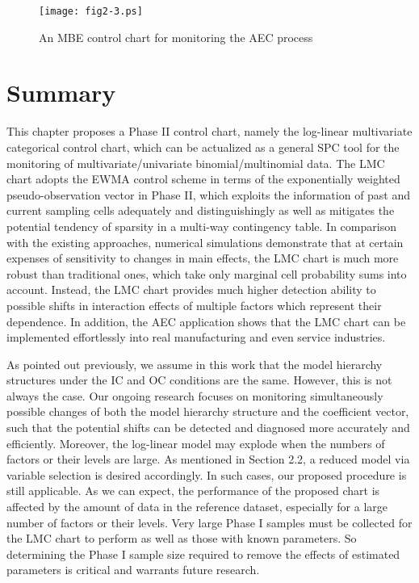 \begin{figure}[ht]
\begin{center}
\texttt{[image: fig2-3.ps]}
\vspace{-0.7cm} \caption{An MBE control chart for monitoring the AEC
process}\vspace{-0.3cm}
\end{center}
\end{figure}



\section{Summary}\label{sec2.6}

This chapter proposes a Phase II control chart, namely the log-linear multivariate
categorical control chart, which can be actualized as a general SPC tool for the
monitoring of multivariate/univariate binomial/multinomial data. The LMC chart
adopts the EWMA control scheme in terms of the exponentially weighted
pseudo-observation vector in Phase II, which exploits the information of past and
current sampling cells adequately and distinguishingly as well as mitigates the
potential tendency of sparsity in a multi-way contingency table. In comparison with
the existing approaches, numerical simulations demonstrate that at certain expenses
of sensitivity to changes in main effects, the LMC chart is much more robust than
traditional ones, which take only marginal cell probability sums into account.
Instead, the LMC chart provides much higher detection ability to possible shifts in
interaction effects of multiple factors which represent their dependence. In
addition, the AEC application shows that the LMC chart can be implemented
effortlessly into real manufacturing and even service industries.

As pointed out previously, we assume in this work that the model hierarchy
structures under the IC and OC conditions are the same. However, this is not always
the case. Our ongoing research focuses on monitoring simultaneously possible changes
of both the model hierarchy structure and the coefficient vector, such that the
potential shifts can be detected and diagnosed more accurately and efficiently.
Moreover, the log-linear model may explode when the numbers of factors or their
levels are large. As mentioned in Section 2.2, a reduced model via variable
selection is desired accordingly. In such cases, our proposed procedure is still
applicable. As we can expect, the performance of the proposed chart is affected by
the amount of data in the reference dataset, especially for a large number of
factors or their levels. Very large Phase I samples must be collected for the LMC
chart to perform as well as those with known parameters. So determining the Phase I
sample size required to remove the effects of estimated parameters is critical and
warrants future research.
